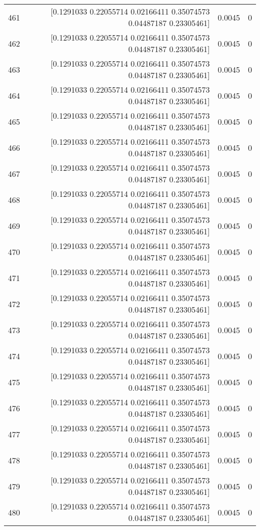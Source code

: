\begin{longtable}{lrrr}
461 & [0.1291033  0.22055714 0.02166411 0.35074573 0.04487187 0.23305461] & 0.0045 & 0 \\
462 & [0.1291033  0.22055714 0.02166411 0.35074573 0.04487187 0.23305461] & 0.0045 & 0 \\
463 & [0.1291033  0.22055714 0.02166411 0.35074573 0.04487187 0.23305461] & 0.0045 & 0 \\
464 & [0.1291033  0.22055714 0.02166411 0.35074573 0.04487187 0.23305461] & 0.0045 & 0 \\
465 & [0.1291033  0.22055714 0.02166411 0.35074573 0.04487187 0.23305461] & 0.0045 & 0 \\
466 & [0.1291033  0.22055714 0.02166411 0.35074573 0.04487187 0.23305461] & 0.0045 & 0 \\
467 & [0.1291033  0.22055714 0.02166411 0.35074573 0.04487187 0.23305461] & 0.0045 & 0 \\
468 & [0.1291033  0.22055714 0.02166411 0.35074573 0.04487187 0.23305461] & 0.0045 & 0 \\
469 & [0.1291033  0.22055714 0.02166411 0.35074573 0.04487187 0.23305461] & 0.0045 & 0 \\
470 & [0.1291033  0.22055714 0.02166411 0.35074573 0.04487187 0.23305461] & 0.0045 & 0 \\
471 & [0.1291033  0.22055714 0.02166411 0.35074573 0.04487187 0.23305461] & 0.0045 & 0 \\
472 & [0.1291033  0.22055714 0.02166411 0.35074573 0.04487187 0.23305461] & 0.0045 & 0 \\
473 & [0.1291033  0.22055714 0.02166411 0.35074573 0.04487187 0.23305461] & 0.0045 & 0 \\
474 & [0.1291033  0.22055714 0.02166411 0.35074573 0.04487187 0.23305461] & 0.0045 & 0 \\
475 & [0.1291033  0.22055714 0.02166411 0.35074573 0.04487187 0.23305461] & 0.0045 & 0 \\
476 & [0.1291033  0.22055714 0.02166411 0.35074573 0.04487187 0.23305461] & 0.0045 & 0 \\
477 & [0.1291033  0.22055714 0.02166411 0.35074573 0.04487187 0.23305461] & 0.0045 & 0 \\
478 & [0.1291033  0.22055714 0.02166411 0.35074573 0.04487187 0.23305461] & 0.0045 & 0 \\
479 & [0.1291033  0.22055714 0.02166411 0.35074573 0.04487187 0.23305461] & 0.0045 & 0 \\
480 & [0.1291033  0.22055714 0.02166411 0.35074573 0.04487187 0.23305461] & 0.0045 & 0 \\

\end{longtable}
